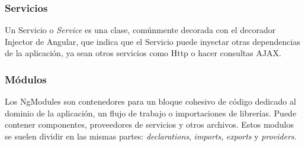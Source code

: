 \subsubsection{Servicios}

Un Servicio o \textit{Service} es una clase, comúnmente decorada con el decorador Injector de Angular, que indica que el Servicio puede inyectar otras dependencias de la aplicación, ya sean otros servicios como Http o hacer consultas AJAX.

\subsubsection{Módulos}

Los NgModules son contenedores para un bloque cohesivo de código dedicado al dominio de la aplicación, un flujo de trabajo o importaciones de librerías. Puede contener componentes, proveedores de servicios y otros archivos. Estos modulos se suelen dividir en las mismas partes: \textit{declarations}, \textit{imports}, \textit{exports} y \textit{providers}.



